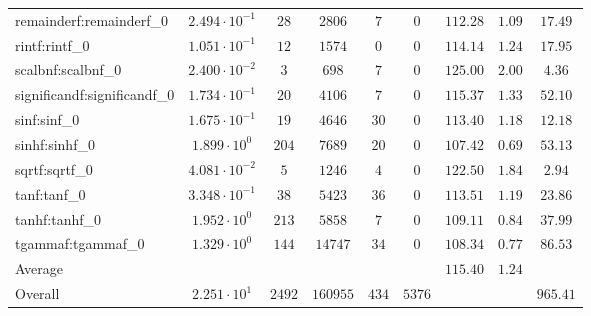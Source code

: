 \begin{tabular}{|l|c|c|c|c|c|c|c|c|}
remainderf:remainderf\_0     & $ 2.494 \cdot 10^{-1} $ & $ 28     $ & $ 2806   $ & $ 7   $ & $ 0    $ & $ 112.28      $ & $ 1.09    $ & $ 17.49   $ \\
rintf:rintf\_0               & $ 1.051 \cdot 10^{-1} $ & $ 12     $ & $ 1574   $ & $ 0   $ & $ 0    $ & $ 114.14      $ & $ 1.24    $ & $ 17.95   $ \\
scalbnf:scalbnf\_0           & $ 2.400 \cdot 10^{-2} $ & $ 3      $ & $ 698    $ & $ 7   $ & $ 0    $ & $ 125.00      $ & $ 2.00    $ & $ 4.36    $ \\
significandf:significandf\_0 & $ 1.734 \cdot 10^{-1} $ & $ 20     $ & $ 4106   $ & $ 7   $ & $ 0    $ & $ 115.37      $ & $ 1.33    $ & $ 52.10   $ \\
sinf:sinf\_0                 & $ 1.675 \cdot 10^{-1} $ & $ 19     $ & $ 4646   $ & $ 30  $ & $ 0    $ & $ 113.40      $ & $ 1.18    $ & $ 12.18   $ \\
sinhf:sinhf\_0               & $ 1.899 \cdot 10^{0}  $ & $ 204    $ & $ 7689   $ & $ 20  $ & $ 0    $ & $ 107.42      $ & $ 0.69    $ & $ 53.13   $ \\
sqrtf:sqrtf\_0               & $ 4.081 \cdot 10^{-2} $ & $ 5      $ & $ 1246   $ & $ 4   $ & $ 0    $ & $ 122.50      $ & $ 1.84    $ & $ 2.94    $ \\
tanf:tanf\_0                 & $ 3.348 \cdot 10^{-1} $ & $ 38     $ & $ 5423   $ & $ 36  $ & $ 0    $ & $ 113.51      $ & $ 1.19    $ & $ 23.86   $ \\
tanhf:tanhf\_0               & $ 1.952 \cdot 10^{0}  $ & $ 213    $ & $ 5858   $ & $ 7   $ & $ 0    $ & $ 109.11      $ & $ 0.84    $ & $ 37.99   $ \\
tgammaf:tgammaf\_0           & $ 1.329 \cdot 10^{0}  $ & $ 144    $ & $ 14747  $ & $ 34  $ & $ 0    $ & $ 108.34      $ & $ 0.77    $ & $ 86.53   $ \\
\hline
Average                      & $                     $ & $        $ & $        $ & $     $ & $      $ & $ 115.40      $ & $ 1.24    $ & $         $ \\
\hline
Overall                      & $ 2.251 \cdot 10^{1}  $ & $ 2492   $ & $ 160955 $ & $ 434 $ & $ 5376 $ & $             $ & $         $ & $ 965.41  $ \\
\hline
\end{tabular}
